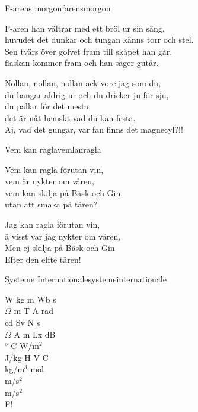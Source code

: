 \begin{song}{F-arens morgon}{farensmorgon}
\begin{vers}
F-aren han vältrar med ett bröl ur sin säng,\\
huvudet det dunkar och tungan känns torr och stel.\\
Sen tvärs över golvet fram till skåpet han går,\\
flaskan kommer fram och han säger gutår.\\
\end{vers}
\begin{vers}
Nollan, nollan, nollan ack vore jag som du,\\
du bangar aldrig ur och du dricker ju för sju,\\
du pallar för det mesta,\\
det är nåt hemskt vad du kan festa.\\
Aj, vad det gungar, var fan finns det magnecyl?!!\\
\end{vers}
\end{song}

\newpage



\begin{song}{Vem kan ragla}{vemlanragla}
\begin{vers}
Vem kan ragla förutan vin,\\
vem är nykter om våren,\\
vem kan skilja på Bäsk och Gin,\\
utan att smaka på tåren?\\
\end{vers}
\begin{vers}
Jag kan ragla förutan vin,\\
å visst var jag nykter om våren,\\
Men ej skilja på Bäsk och Gin\\
Efter den elfte tåren!\\
\end{vers}
\end{song}


\begin{song}{Systeme Internationale}{systemeinternationale}
\begin{vers}
W kg m Wb s\\
$\Omega$ m T A rad\\
cd Sv N s\\
$\Omega$ A m Lx dB\\
$^o$ C W/m$^2$\\
J/kg H V C\\
kg/m$^3$ mol\\
m/s$^2$\\
m/s$^2$\\
F!\\
\end{vers}
\end{song}
\newpage

